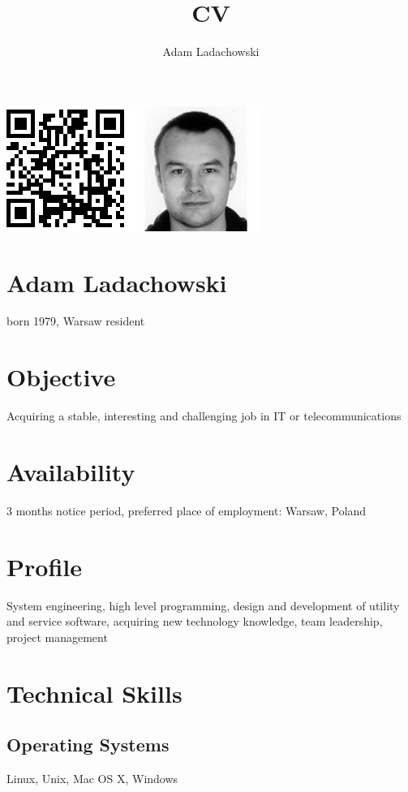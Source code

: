 \documentclass[9pt,a4paper,twocolumn]{extarticle}
\title{CV}
\author{Adam Ladachowski}
\begin{document}
\includegraphics[width=\columnwidth]{photo_qr.png}
\vspace{0.2cm}

\section*{Adam Ladachowski}
born 1979, Warsaw resident

\section*{Objective}

Acquiring a stable, interesting and challenging job in IT or telecommunications

\section*{Availability}

3 months notice period, preferred place of employment: Warsaw, Poland

\section*{Profile}

System engineering, high level programming, design and development of utility and service software, acquiring new technology knowledge, team leadership, project management

\section*{Technical Skills}

\subsection*{Operating Systems}
Linux, Unix, Mac OS X, Windows
\end{document}
